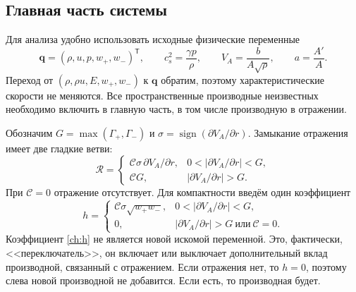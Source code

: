 \documentclass[11pt,a4paper]{article}
\newcommand{\VA}{V_A}
\newcommand{\Rref}{\mathcal R}
\begin{document}
\subsection{Главная часть системы}

Для анализа удобно использовать исходные физические переменные
\[
 \bm q=(\rho,u,p,w_+,w_-)^{\mathsf T},\qquad
 c_s^2=\frac{\gamma p}{\rho},\qquad
 \VA=\frac{b}{A\sqrt\rho},\qquad a=\frac{A'}A.
\]
Переход от $(\rho,\rho u,E,w_+,w_-)$ к $\bm q$ обратим, поэтому характеристические скорости не меняются.
Все пространственные производные неизвестных необходимо включить
в главную часть, в том числе производную в отражении.

Обозначим $G=\max(\Gamma_+,\Gamma_-)$ и
$\sigma=\operatorname{sign}(\partial\VA/\partial r)$.
Замыкание отражения имеет две гладкие ветви:
\[
 \Rref=\begin{cases}
 \mathcal C\sigma\,\partial\VA/\partial r,
     &0<|\partial\VA/\partial r|<G,\\
 \mathcal C G,&|\partial\VA/\partial r|>G.
 \end{cases}
\]
При $\mathcal C=0$ отражение отсутствует. Для компактности введём один коэффициент
\begin{equation}
 h=\begin{cases}
 \mathcal C\sigma\sqrt{w_+w_-},
     &0<|\partial\VA/\partial r|<G,\\
 0,&|\partial\VA/\partial r|>G\ \text{или}\ \mathcal C=0.
 \end{cases}
 \label{ch:h}
\end{equation}
Коэффициент \eqref{ch:h} не является новой искомой переменной. Это, фактически, <<переключатель>>, он включает или выключает дополнительный вклад производной, связанный с отражением. Если отражения нет, то $h = 0$, поэтому слева новой производной не добавится. Если есть, то производная будет.
\end{document}
